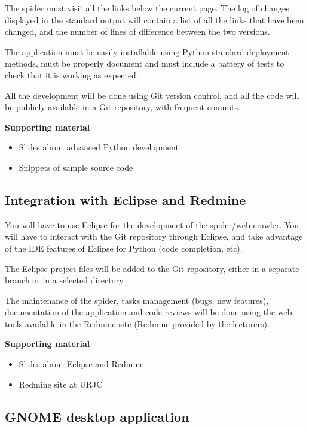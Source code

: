 \documentclass[a4paper]{article}
\begin{document}
The spider must visit all the links below the current page. The log of
changes displayed in the standard output will contain a list of all
the links that have been changed, and the number of lines of
difference between the two versions.

The application must be easily installable using Python standard
deployment methods, must be properly document and must include a
battery of tests to check that it is working as expected.

All the development will be done using Git version control, and all
the code will be publicly available in a Git repository, with frequent
commits.

\textbf{Supporting material}

\begin{itemize}
\item Slides about advanced Python development
\item Snippets of sample source code
\end{itemize}

\subsection{Integration with Eclipse and Redmine}
\label{sub:eclipse}

You will have to use Eclipse for the development of the spider/web
crawler. You will have to interact with the Git repository through
Eclipse, and take advantage of the IDE features of Eclipse for Python
(code completion, etc).

The Eclipse project files will be added to the Git repository, either
in a separate branch or in a selected directory.

The maintenance of the spider, tasks management (bugs, new features),
documentation of the application and code reviews will be done using
the web tools available in the Redmine site (Redmine provided by the
lecturers).

\textbf{Supporting material}

\begin{itemize}
\item Slides about Eclipse and Redmine
\item Redmine site at URJC
\end{itemize}


\subsection{GNOME desktop application}
\label{sub:eclipse}
\end{document}
